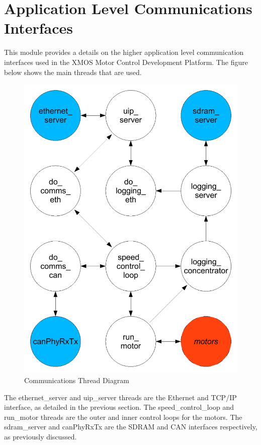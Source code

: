 \section{Application Level Communications Interfaces}

This module provides a details on the higher application level communication interfaces used in the XMOS Motor Control Development Platform.
The figure below shows the main threads that are used.

\begin{figure}[h]
\begin{center}
\includegraphics[height=0.6\textheight]{images/comms_threads}
\caption{Communications Thread Diagram}
\label{fig_comms_threads}
\end{center}
\end{figure}

The ethernet\_server and uip\_server threads are the Ethernet and TCP/IP interface, as detailed in the previous section.
The speed\_control\_loop and run\_motor threads are the outer and inner control loops for the motors.
The sdram\_server and canPhyRxTx are the SDRAM and CAN interfaces respectively, as previously discussed.


